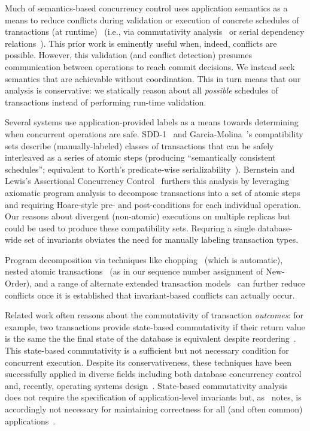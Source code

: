 Much of semantics-based concurrency control uses application semantics
as a means to reduce conflicts during validation or execution of
concrete schedules of transactions (at
runtime)~\cite{badrinath-semantics} (i.e., via commutativity
analysis~\cite{weihl-thesis} or serial dependency
relations~\cite{herlihy-apologizing}). This prior work is eminently
useful when, indeed, conflicts are possible. However, this validation
(and conflict detection) presumes communication between operations to
reach commit decisions. We instead seek semantics that are achievable
without coordination. This in turn means that our \iconfluence
analysis is conservative: we statically reason about all
\textit{possible} schedules of transactions instead of performing
run-time validation.

Several systems use application-provided labels as a means towards
determining when concurrent operations are safe. SDD-1~\cite{sdd1} and
Garcia-Molina~\cite{garciamolina-semantics}'s compatibility
  sets describe (manually-labeled) classes of transactions that can
be safely interleaved as a series of atomic steps (producing
``semantically consistent schedules''; equivalent to Korth's
predicate-wise
serializability~\cite{korth-serializability}). Bernstein and Lewis's
Assertional Concurrency Control~\cite{decomp-semantics}
furthers this analysis by leveraging axiomatic program analysis to
decompose transactions into a set of atomic steps and requiring
Hoare-style pre- and post-conditions for each individual
operation. Our \iconfluence reasons about divergent (non-atomic)
executions on multiple replicas but could be used to produce these
compatibility sets. Requring a single database-wide set of invariants
obviates the need for manually labeling transaction types.

Program decomposition via techniques like chopping~\cite{chopping}
(which is automatic), nested atomic
transactions~\cite{atomictransactions} (as in our sequence number
assignment of New-Order), and a range of alternate extended
  transaction models~\cite{acta} can further reduce conflicts once it
is established that invariant-based conflicts can actually occur.

 Related work often reasons about
the commutativity of transaction \textit{outcomes}: for example, two
transactions provide state-based commutativity if their return value
is the same the the final state of the database is equivalent despite
reordering~\cite{weihl-data,weihl-thesis}. This state-based
  commutativity is a sufficient but not necessary condition for
concurrent execution. Despite its conservativeness, these techniques
have been successfully applied in diverse fields including both
database concurrency control and, recently, operating systems
design~\cite{kohler-commutativity}. State-based commutativity analysis
does not require the specification of application-level invariants
but, as~\cite{kohler-commutativity} notes, is accordingly not
necessary for maintaining correctness for all (and often common)
applications~\cite{lamport-audit}.

